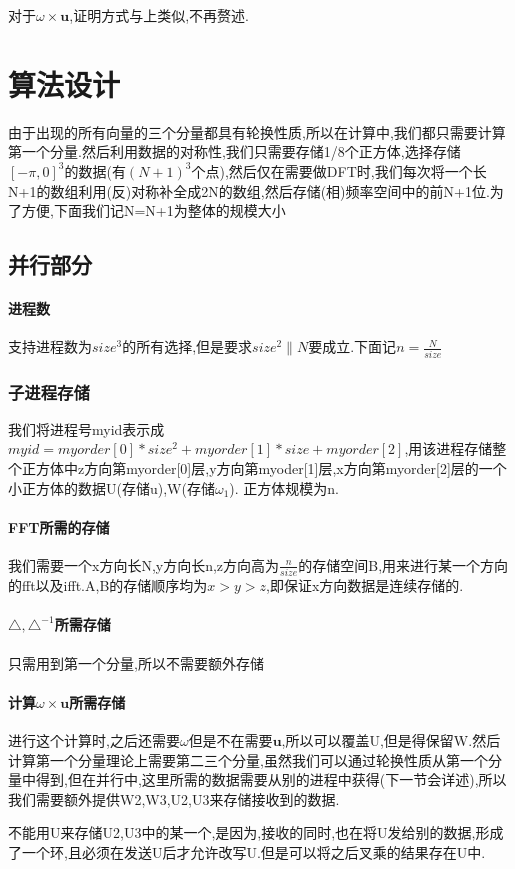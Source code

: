 \documentclass[UTF8]{ctexart}
\begin{document}
对于$\omega \times \mathbf{u}$,证明方式与上类似,不再赘述.
\section{算法设计}
由于出现的所有向量的三个分量都具有轮换性质,所以在计算中,我们都只需要计算第一个分量.然后利用数据的对称性,我们只需要存储1/8个正方体,选择存储$[-\pi,0]^3$的数据(有$(N+1)^3$个点),然后仅在需要做DFT时,我们每次将一个长N+1的数组利用(反)对称补全成2N的数组,然后存储(相)频率空间中的前N+1位.为了方便,下面我们记N=N+1为整体的规模大小
\subsection{并行部分}

\paragraph{进程数}
支持进程数为$size^3$的所有选择,但是要求$size^2\|N$要成立.下面记$n=\frac{N}{size}$
\subsubsection{子进程存储}
我们将进程号myid表示成$myid=myorder[0]*size^2+myorder[1]*size+myorder[2]$,用该进程存储整个正方体中z方向第myorder[0]层,y方向第myoder[1]层,x方向第myorder[2]层的一个小正方体的数据U(存储u),W(存储$\omega_1$). 正方体规模为n.
\paragraph{FFT所需的存储}
我们需要一个x方向长N,y方向长n,z方向高为$\frac{n}{size}$的存储空间B,用来进行某一个方向的fft以及ifft.A,B的存储顺序均为$x>y>z$,即保证x方向数据是连续存储的.
\paragraph{$\triangle,\triangle^{-1}$所需存储}
只需用到第一个分量,所以不需要额外存储
\paragraph{计算$\omega\times\mathbf{u}$所需存储}
进行这个计算时,之后还需要$\omega$但是不在需要$\mathbf{u}$,所以可以覆盖U,但是得保留W.然后计算第一个分量理论上需要第二三个分量,虽然我们可以通过轮换性质从第一个分量中得到,但在并行中,这里所需的数据需要从别的进程中获得(下一节会详述),所以我们需要额外提供W2,W3,U2,U3来存储接收到的数据.

不能用U来存储U2,U3中的某一个,是因为,接收的同时,也在将U发给别的数据,形成了一个环,且必须在发送U后才允许改写U.但是可以将之后叉乘的结果存在U中.
\end{document}
